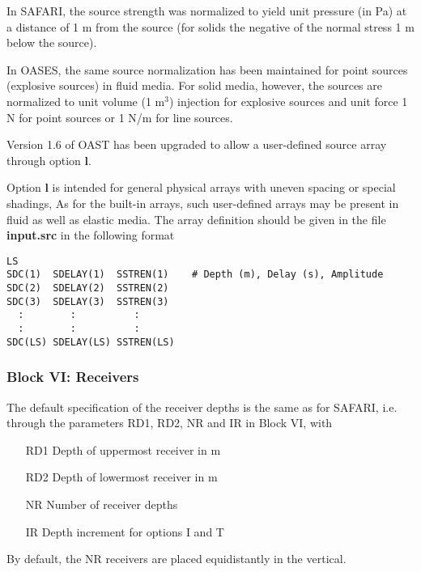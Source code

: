 
    In  SAFARI,  the source strength was normalized to yield unit
pressure (in Pa) 
at a distance of 1 m from the source (for 
solids the negative of the normal stress 1 m below the source). 

    In  OASES, the same source normalization has been  maintained 
for point sources (explosive sources) in fluid media.
    For solid media, however, the sources are normalized to  unit 
volume (1 m$^3$) injection for explosive sources and unit force 
1 N for point sources or 1 N/m for line sources.

\label{oastsou}

Version 1.6 of OAST has been upgraded to allow a user-defined source
array through option {\bf l}. 

Option {\bf l} is intended
for general physical arrays with uneven spacing or special shadings,
As for the built-in arrays, such user-defined arrays may be present in
fluid as well as elastic media. The array definition should be given
in the file {\bf input.src} in the following format

\small
\begin{verbatim}
LS
SDC(1)  SDELAY(1)  SSTREN(1)    # Depth (m), Delay (s), Amplitude
SDC(2)  SDELAY(2)  SSTREN(2) 
SDC(3)  SDELAY(3)  SSTREN(3) 
  :        :          :
  :        :          :
SDC(LS) SDELAY(LS) SSTREN(LS) 
\end{verbatim}
\normalsize

\subsubsection{Block VI: Receivers}

The default specification of the receiver depths is the same as for
SAFARI, i.e. through the parameters RD1, RD2, NR and IR in Block VI, with
\begin{itemize}
\item[RD1]  Depth of uppermost receiver in m 
\item[RD2]  Depth of lowermost receiver in m 
\item[NR] Number of receiver depths 
\item[IR]   Depth increment for options I and T
\end{itemize}

By default, the NR receivers are placed equidistantly in the vertical.


